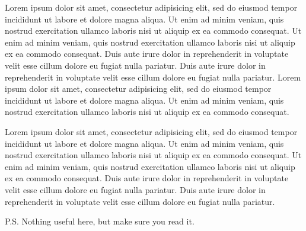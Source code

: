 \documentclass[11pt]{wade}
\begin{document}
Lorem ipsum dolor sit amet, consectetur adipisicing elit, sed do eiusmod tempor incididunt ut labore et dolore magna aliqua. Ut enim ad minim veniam, quis nostrud exercitation ullamco laboris nisi ut aliquip ex ea commodo consequat. Ut enim ad minim veniam, quis nostrud exercitation ullamco laboris nisi ut aliquip ex ea commodo consequat. Duis aute irure dolor in reprehenderit in voluptate velit esse cillum dolore eu fugiat nulla pariatur. Duis aute irure dolor in reprehenderit in voluptate velit esse cillum dolore eu fugiat nulla pariatur. Lorem ipsum dolor sit amet, consectetur adipisicing elit, sed do eiusmod tempor incididunt ut labore et dolore magna aliqua. Ut enim ad minim veniam, quis nostrud exercitation ullamco laboris nisi ut aliquip ex ea commodo consequat.

Lorem ipsum dolor sit amet, consectetur adipisicing elit, sed do eiusmod tempor incididunt ut labore et dolore magna aliqua. Ut enim ad minim veniam, quis nostrud exercitation ullamco laboris nisi ut aliquip ex ea commodo consequat. Ut enim ad minim veniam, quis nostrud exercitation ullamco laboris nisi ut aliquip ex ea commodo consequat. Duis aute irure dolor in reprehenderit in voluptate velit esse cillum dolore eu fugiat nulla pariatur. Duis aute irure dolor in reprehenderit in voluptate velit esse cillum dolore eu fugiat nulla pariatur.

\printclosing

\vspace*{1.15em}
P.S. Nothing useful here, but make sure you read it.
\end{document}
